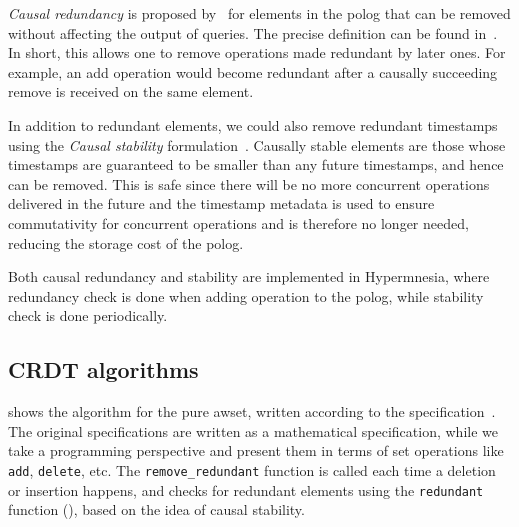 \emph{Causal redundancy} is proposed by~\citet{baquero2017PureOp} for elements in
the \acrshort{polog} that can be removed without affecting the output of
queries. The precise definition can be found in~\cite{baquero2017PureOp,baquero2014PureOp}. 
In short, this allows one to remove operations made redundant by later ones. For
example, an add operation would become redundant after a causally succeeding remove 
is received on the same element.

In addition to redundant elements, we could also remove redundant timestamps 
using the \emph{Causal stability} formulation~\citet{baquero2017PureOp}.
Causally stable elements are those whose timestamps are guaranteed to be smaller
than any future timestamps, and hence can be removed.
This is safe since there will be no more
concurrent operations delivered in the future and the timestamp metadata is
used to ensure commutativity for concurrent operations and is therefore no longer
needed, reducing the storage cost of the \acrshort{polog}.

Both causal redundancy and stability are implemented in Hypermnesia, where redundancy
check is done when adding operation to the \acrshort{polog}, while stability check 
is done periodically.

\subsection{CRDT algorithms} \label{subsec:impl pawset algorithm}


 shows the algorithm for the pure \acrshort{awset},
written according to the specification~\cite{baquero2017PureOp,baquero2014PureOp}.
The original specifications
are written as a mathematical specification, while we take
a programming perspective and present them in terms of set operations like
\texttt{add}, \texttt{delete}, etc. The \verb|remove_redundant| function is called
each time a deletion or insertion happens, and checks
for redundant elements using the \verb|redundant| 
function (), based on the 
idea of causal stability.

